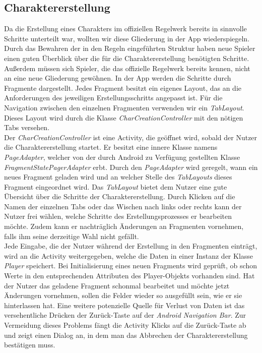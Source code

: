 \subsection{Charaktererstellung}
Da die Erstellung eines Charakters im offiziellen Regelwerk bereits in sinnvolle Schritte unterteilt war, wollten wir diese Gliederung in der App wiederspiegeln. Durch das Bewahren der in den Regeln eingeführten Struktur haben neue Spieler einen guten Überblick über die für die Charaktererstellung benötigten Schritte. Außerdem müssen sich Spieler, die das offizielle Regelwerk bereits kennen, nicht an eine neue Gliederung gewöhnen. In der App werden die Schritte durch Fragmente dargestellt. Jedes Fragment besitzt ein eigenes Layout, das an die Anforderungen des jeweiligen Erstellungsschritts angepasst ist. Für die Navigation zwischen den einzelnen Fragmenten verwenden wir ein \textit{TabLayout}. Dieses Layout wird durch die Klasse \textit{CharCreationController} mit den nötigen Tabs versehen.\\

Der \textit{CharCreationController} ist eine Activity, die geöffnet wird, sobald der Nutzer die Charaktererstellung startet. Er besitzt eine innere Klasse namens \textit{PageAdapter}, welcher von der durch Android zu Verfügung gestellten Klasse \textit{FragmentStatePagerAdapter} erbt. Durch den \textit{PageAdapter} wird geregelt, wann ein neues Fragment geladen wird und an welcher Stelle des \textit{TabLayouts} dieses Fragment eingeordnet wird. Das \textit{TabLayout} bietet dem Nutzer eine gute Übersicht über die Schritte der Charaktererstellung. Durch Klicken auf die Namen der einzelnen Tabs oder das Wischen nach links oder rechts kann der Nutzer frei wählen, welche Schritte des Erstellungsprozesses er bearbeiten möchte. Zudem kann er nachträglich Änderungen an Fragmenten vornehmen, falls ihm seine derzeitige Wahl nicht gefällt.\\

Jede Eingabe, die der Nutzer während der Erstellung in den Fragmenten einträgt, wird an die Activity weitergegeben, welche die Daten in einer Instanz der Klasse \textit{Player} speichert. Bei Initialisierung eines neuen Fragments wird geprüft, ob schon Werte in den entsprechenden Attributen des Player-Objekts vorhanden sind. Hat der Nutzer das geladene Fragment schonmal bearbeitet und möchte jetzt Änderungen vornehmen, sollen die Felder wieder so ausgefüllt sein, wie er sie hinterlassen hat. Eine weitere potenzielle Quelle für Verlust von Daten ist das versehentliche Drücken der Zurück-Taste auf der \textit{Android Navigation Bar}. Zur Vermeidung dieses Problems fängt die Activity Klicks auf die Zurück-Taste ab und zeigt einen Dialog an, in dem man das Abbrechen der Charaktererstellung bestätigen muss.\\

